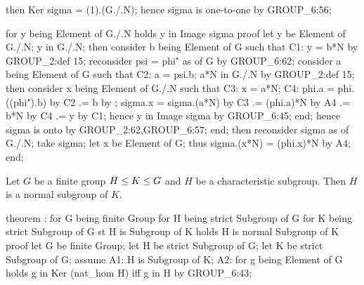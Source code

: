     then Ker sigma = (1).(G./.N);
    hence sigma is one-to-one by GROUP_6:56;

    for y being Element of G./.N holds y in Image sigma
    proof
      let y be Element of G./.N;
      y in G./.N;
      then consider b being Element of G such that
      C1: y = b*N by GROUP_2:def 15;
      reconsider psi = phi" as  of G by GROUP_6:62;
      consider a being Element of G such that
      C2: a = psi.b;
      a*N in G./.N by GROUP_2:def 15;
      then consider x being Element of G./.N such that
      C3: x = a*N;
      C4: phi.a = phi.((phi").b) by C2
               .= b by ;
      sigma.x = sigma.(a*N) by C3
             .= (phi.a)*N by A4
             .= b*N by C4
             .= y by C1;
      hence y in Image sigma by GROUP_6:45;
    end;
    hence sigma is onto by GROUP_2:62,GROUP_6:57;
  end;
  then reconsider sigma as  of G./.N;
  take sigma;
  let x be Element of G;
  thus sigma.(x*N) = (phi.x)*N by A4;
end;
\eatline
{}\nwendcode{}\nwdocspar
\begin{theorem}
Let $G$ be a finite group $H\leq K\leq G$ and $H$ be a characteristic
subgroup. Then $H$ is a normal subgroup of $K$.
\end{theorem}

\nwenddocs{}\endmoddef\nwstartdeflinemarkup{}\nwenddeflinemarkup
theorem :
  for G being finite Group
  for H being strict  Subgroup of G
  for K being strict Subgroup of G
  st H is Subgroup of K
  holds H is normal Subgroup of K
proof
  let G be finite Group;
  let H be strict  Subgroup of G;
  let K be strict Subgroup of G;
  assume A1: H is Subgroup of K;
  A2: for g being Element of G
  holds g in Ker (nat_hom H) iff g in H by GROUP_6:43;

